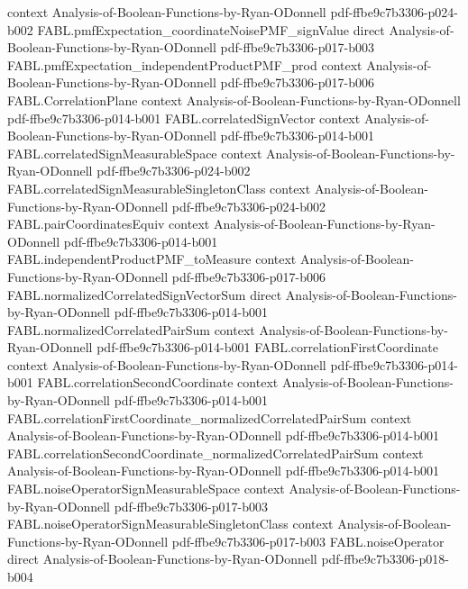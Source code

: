 \begin{theorem}
  {context}
  {Analysis-of-Boolean-Functions-by-Ryan-ODonnell}
  {pdf-ffbe9c7b3306-p024-b002}
\proofstep
  {FABL.pmfExpectation_coordinateNoisePMF_signValue}
  {direct}
  {Analysis-of-Boolean-Functions-by-Ryan-ODonnell}
  {pdf-ffbe9c7b3306-p017-b003}
\proofstep
  {FABL.pmfExpectation_independentProductPMF_prod}
  {context}
  {Analysis-of-Boolean-Functions-by-Ryan-ODonnell}
  {pdf-ffbe9c7b3306-p017-b006}
\proofstep
  {FABL.CorrelationPlane}
  {context}
  {Analysis-of-Boolean-Functions-by-Ryan-ODonnell}
  {pdf-ffbe9c7b3306-p014-b001}
\proofstep
  {FABL.correlatedSignVector}
  {context}
  {Analysis-of-Boolean-Functions-by-Ryan-ODonnell}
  {pdf-ffbe9c7b3306-p014-b001}
\proofstep
  {FABL.correlatedSignMeasurableSpace}
  {context}
  {Analysis-of-Boolean-Functions-by-Ryan-ODonnell}
  {pdf-ffbe9c7b3306-p024-b002}
\proofstep
  {FABL.correlatedSignMeasurableSingletonClass}
  {context}
  {Analysis-of-Boolean-Functions-by-Ryan-ODonnell}
  {pdf-ffbe9c7b3306-p024-b002}
\proofstep
  {FABL.pairCoordinatesEquiv}
  {context}
  {Analysis-of-Boolean-Functions-by-Ryan-ODonnell}
  {pdf-ffbe9c7b3306-p014-b001}
\proofstep
  {FABL.independentProductPMF_toMeasure}
  {context}
  {Analysis-of-Boolean-Functions-by-Ryan-ODonnell}
  {pdf-ffbe9c7b3306-p017-b006}
\proofstep
  {FABL.normalizedCorrelatedSignVectorSum}
  {direct}
  {Analysis-of-Boolean-Functions-by-Ryan-ODonnell}
  {pdf-ffbe9c7b3306-p014-b001}
\proofstep
  {FABL.normalizedCorrelatedPairSum}
  {context}
  {Analysis-of-Boolean-Functions-by-Ryan-ODonnell}
  {pdf-ffbe9c7b3306-p014-b001}
\proofstep
  {FABL.correlationFirstCoordinate}
  {context}
  {Analysis-of-Boolean-Functions-by-Ryan-ODonnell}
  {pdf-ffbe9c7b3306-p014-b001}
\proofstep
  {FABL.correlationSecondCoordinate}
  {context}
  {Analysis-of-Boolean-Functions-by-Ryan-ODonnell}
  {pdf-ffbe9c7b3306-p014-b001}
\proofstep
  {FABL.correlationFirstCoordinate_normalizedCorrelatedPairSum}
  {context}
  {Analysis-of-Boolean-Functions-by-Ryan-ODonnell}
  {pdf-ffbe9c7b3306-p014-b001}
\proofstep
  {FABL.correlationSecondCoordinate_normalizedCorrelatedPairSum}
  {context}
  {Analysis-of-Boolean-Functions-by-Ryan-ODonnell}
  {pdf-ffbe9c7b3306-p014-b001}
\proofstep
  {FABL.noiseOperatorSignMeasurableSpace}
  {context}
  {Analysis-of-Boolean-Functions-by-Ryan-ODonnell}
  {pdf-ffbe9c7b3306-p017-b003}
\proofstep
  {FABL.noiseOperatorSignMeasurableSingletonClass}
  {context}
  {Analysis-of-Boolean-Functions-by-Ryan-ODonnell}
  {pdf-ffbe9c7b3306-p017-b003}
\proofstep
  {FABL.noiseOperator}
  {direct}
  {Analysis-of-Boolean-Functions-by-Ryan-ODonnell}
  {pdf-ffbe9c7b3306-p018-b004}
\proofstep

\end{theorem}

